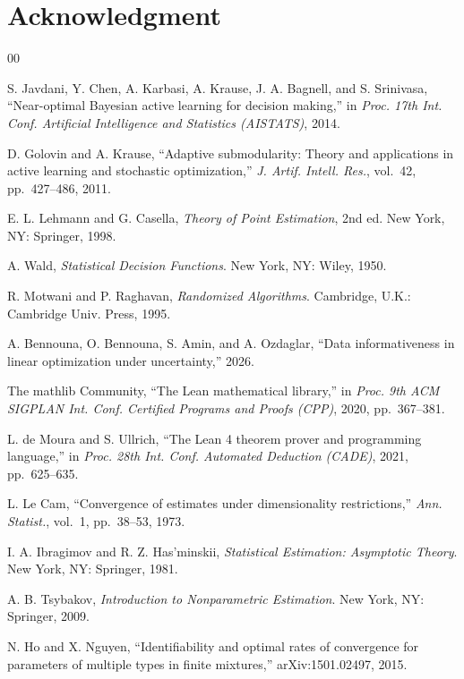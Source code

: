 \section*{Acknowledgment}

\begin{thebibliography}{00}

 S. Javdani, Y. Chen, A. Karbasi, A. Krause, J. A. Bagnell, and
S. Srinivasa, ``Near-optimal Bayesian active learning for decision making,'' in
\emph{Proc. 17th Int. Conf. Artificial Intelligence and Statistics (AISTATS)}, 2014.

 D. Golovin and A. Krause, ``Adaptive submodularity: Theory and
applications in active learning and stochastic optimization,'' \emph{J. Artif. Intell. Res.},
vol.~42, pp.~427--486, 2011.

 E. L. Lehmann and G. Casella, \emph{Theory of Point Estimation},
2nd ed. New York, NY: Springer, 1998.

 A. Wald, \emph{Statistical Decision Functions}. New York, NY: Wiley, 1950.

 R. Motwani and P. Raghavan, \emph{Randomized Algorithms}. Cambridge,
U.K.: Cambridge Univ. Press, 1995.

 A. Bennouna, O. Bennouna, S. Amin, and A. Ozdaglar, ``Data
informativeness in linear optimization under uncertainty,'' 2026.

 The mathlib Community, ``The Lean mathematical library,'' in
\emph{Proc. 9th ACM SIGPLAN Int. Conf. Certified Programs and Proofs (CPP)}, 2020,
pp.~367--381.

 L. de Moura and S. Ullrich, ``The Lean 4 theorem prover and
programming language,'' in \emph{Proc. 28th Int. Conf. Automated Deduction (CADE)}, 2021,
pp.~625--635.

 L. Le Cam, ``Convergence of estimates under dimensionality
restrictions,'' \emph{Ann. Statist.}, vol.~1, pp.~38--53, 1973.

 I. A. Ibragimov and R. Z. Has'minskii, \emph{Statistical Estimation:
Asymptotic Theory}. New York, NY: Springer, 1981.

 A. B. Tsybakov, \emph{Introduction to Nonparametric Estimation}.
New York, NY: Springer, 2009.

 N. Ho and X. Nguyen, ``Identifiability and optimal rates of convergence
for parameters of multiple types in finite mixtures,'' arXiv:1501.02497, 2015.


\end{thebibliography}
